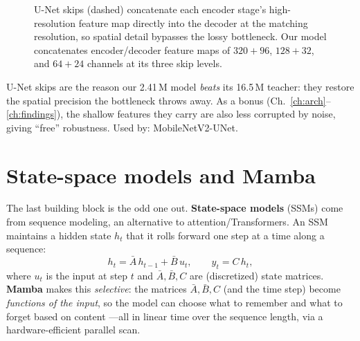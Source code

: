 \begin{figure}[H]
\centering
{}
\caption{U-Net skips (dashed) concatenate each encoder stage's high-resolution feature map directly
into the decoder at the matching resolution, so spatial detail bypasses the lossy bottleneck. Our
model concatenates encoder/decoder feature maps of $320{+}96$, $128{+}32$, and $64{+}24$ channels at
its three skip levels.}
\label{fig:blocks:unet}
\end{figure}

\begin{keyidea}
U-Net skips are the reason our 2.41\,M model \emph{beats} its 16.5\,M teacher: they restore the
spatial precision the bottleneck throws away. As a bonus (Ch.~\ref{ch:arch}--\ref{ch:findings}), the
shallow features they carry are also less corrupted by noise, giving ``free'' robustness. Used by:
MobileNetV2-UNet.
\end{keyidea}

\section{State-space models and Mamba}
\label{sec:blocks:mamba}

The last building block is the odd one out. \textbf{State-space models} (SSMs) come from sequence
modeling, an alternative to attention/Transformers. An SSM maintains a hidden state $h_t$ that it
rolls forward one step at a time along a sequence:
\[
  h_t = \bar{A}\,h_{t-1} + \bar{B}\,u_t, \qquad y_t = C\,h_t ,
\]
where $u_t$ is the input at step $t$ and $\bar A,\bar B,C$ are (discretized) state matrices.
\textbf{Mamba} makes this \emph{selective}: the matrices $\bar A,\bar B,C$ (and the time step) become
\emph{functions of the input}, so the model can choose what to remember and what to forget based on
content ---all in linear time over the sequence length, via a hardware-efficient parallel scan.

